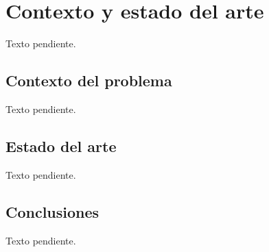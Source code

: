 
\section{Contexto y estado del arte}
Texto pendiente.

\subsection{Contexto del problema}
Texto pendiente.

\subsection{Estado del arte}
Texto pendiente.

\subsection{Conclusiones}
Texto pendiente.
